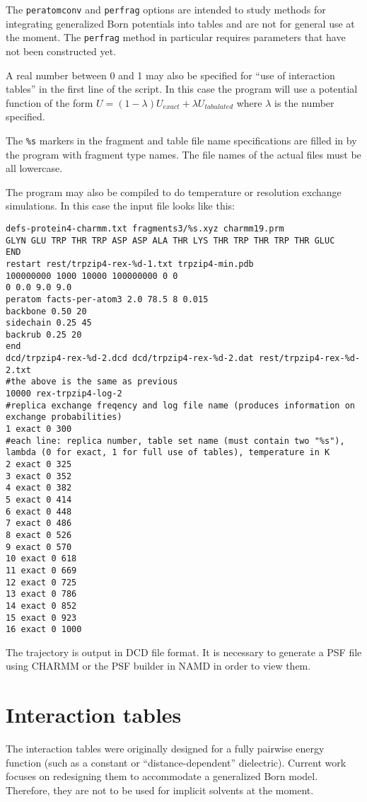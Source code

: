 \documentclass{article}      %
\begin{document}
The \verb+peratomconv+ and \verb+perfrag+ options are intended to study methods for integrating generalized Born potentials into tables and are not for general use at the moment.  The \verb+perfrag+ method in particular requires parameters that have not been constructed yet.


A real number between 0 and 1 may also be specified for ``use of interaction tables'' in the first line of the script.  In this case the program will use a potential function of the form $U=(1-\lambda) U_{exact} + \lambda U_{tabulated}$ where $\lambda$ is the number specified.

The \verb+%s+ markers in the fragment and table file name specifications are filled in by the program with fragment type names.  The file names of the actual files must be all lowercase. 

The program may also be compiled to do temperature or resolution exchange simulations.  In this case the input file looks like this:
\begin{lstlisting}
defs-protein4-charmm.txt fragments3/%s.xyz charmm19.prm
GLYN GLU TRP THR TRP ASP ASP ALA THR LYS THR TRP THR TRP THR GLUC
END
restart rest/trpzip4-rex-%d-1.txt trpzip4-min.pdb
100000000 1000 10000 100000000 0 0
0 0.0 9.0 9.0
peratom facts-per-atom3 2.0 78.5 8 0.015
backbone 0.50 20
sidechain 0.25 45
backrub 0.25 20
end
dcd/trpzip4-rex-%d-2.dcd dcd/trpzip4-rex-%d-2.dat rest/trpzip4-rex-%d-2.txt
#the above is the same as previous
10000 rex-trpzip4-log-2
#replica exchange freqency and log file name (produces information on exchange probabilities)
1 exact 0 300
#each line: replica number, table set name (must contain two "%s"), lambda (0 for exact, 1 for full use of tables), temperature in K
2 exact 0 325
3 exact 0 352
4 exact 0 382
5 exact 0 414
6 exact 0 448
7 exact 0 486
8 exact 0 526
9 exact 0 570
10 exact 0 618
11 exact 0 669
12 exact 0 725
13 exact 0 786
14 exact 0 852
15 exact 0 923
16 exact 0 1000
\end{lstlisting}


The trajectory is output in DCD file format.  It is necessary to generate a PSF file using CHARMM or the PSF builder in NAMD in order to view them.



\section{Interaction tables}

The interaction tables were originally designed for a fully pairwise energy function (such as a constant or ``distance-dependent'' dielectric).  Current work focuses on redesigning them to accommodate a generalized Born model.  Therefore, they are not to be used for implicit solvents at the moment.
\end{document}
